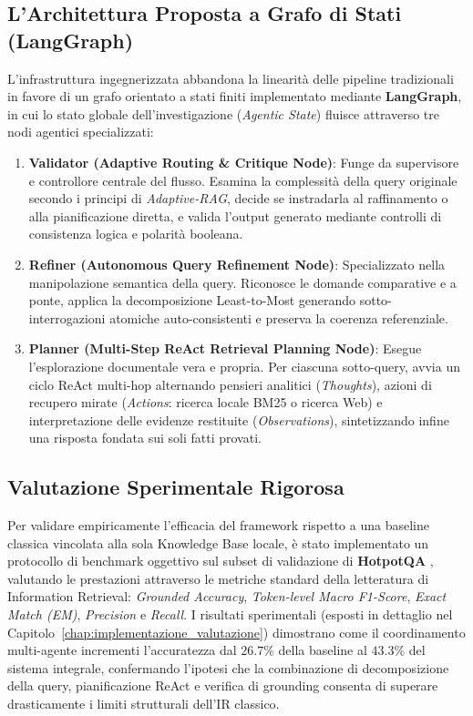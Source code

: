 \subsection{L'Architettura Proposta a Grafo di Stati (LangGraph)}
L'infrastruttura ingegnerizzata abbandona la linearità delle pipeline tradizionali in favore di un grafo orientato a stati finiti implementato mediante \textbf{LangGraph}, in cui lo stato globale dell'investigazione (\textit{Agentic State}) fluisce attraverso tre nodi agentici specializzati:
\begin{enumerate}
    \item \textbf{Validator (Adaptive Routing \& Critique Node)}: Funge da supervisore e controllore centrale del flusso. Esamina la complessità della query originale secondo i principi di \textit{Adaptive-RAG}, decide se instradarla al raffinamento o alla pianificazione diretta, e valida l'output generato mediante controlli di consistenza logica e polarità booleana.
    \item \textbf{Refiner (Autonomous Query Refinement Node)}: Specializzato nella manipolazione semantica della query. Riconosce le domande comparative e a ponte, applica la decomposizione Least-to-Most generando sotto-interrogazioni atomiche auto-consistenti e preserva la coerenza referenziale.
    \item \textbf{Planner (Multi-Step ReAct Retrieval Planning Node)}: Esegue l'esplorazione documentale vera e propria. Per ciascuna sotto-query, avvia un ciclo ReAct multi-hop alternando pensieri analitici (\textit{Thoughts}), azioni di recupero mirate (\textit{Actions}: ricerca locale BM25 o ricerca Web) e interpretazione delle evidenze restituite (\textit{Observations}), sintetizzando infine una risposta fondata sui soli fatti provati.
\end{enumerate}

\subsection{Valutazione Sperimentale Rigorosa}
Per validare empiricamente l'efficacia del framework rispetto a una baseline classica vincolata alla sola Knowledge Base locale, è stato implementato un protocollo di benchmark oggettivo sul subset di validazione di \textbf{HotpotQA} \cite{yang2018hotpotqa}, valutando le prestazioni attraverso le metriche standard della letteratura di Information Retrieval: \textit{Grounded Accuracy}, \textit{Token-level Macro F1-Score}, \textit{Exact Match (EM)}, \textit{Precision} e \textit{Recall}. I risultati sperimentali (esposti in dettaglio nel Capitolo~\ref{chap:implementazione_valutazione}) dimostrano come il coordinamento multi-agente incrementi l'accuratezza dal $26.7\%$ della baseline al $43.3\%$ del sistema integrale, confermando l'ipotesi che la combinazione di decomposizione della query, pianificazione ReAct e verifica di grounding consenta di superare drasticamente i limiti strutturali dell'IR classico.

